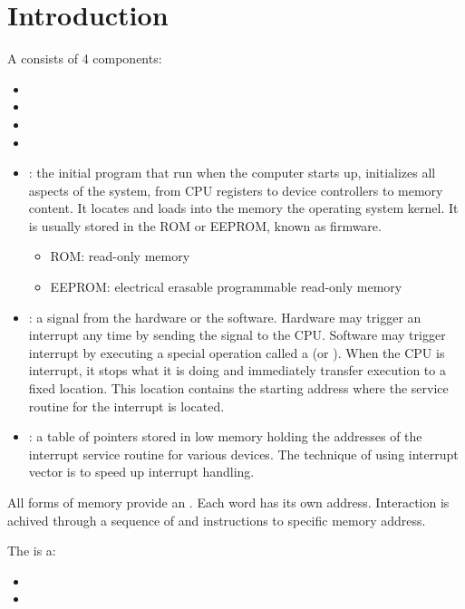 \chapter{Introduction}


    \par A  consists of 4 components:
    \begin{itemize}
      \item {}
      \item {}
      \item {}
      \item {}
    \end{itemize}


    \begin{itemize}
      \item {}: the initial program that run when the computer
        starts up, initializes all aspects of the system, from CPU registers to
          device controllers to memory content. It locates and loads into the
          memory the operating system kernel. It is usually stored in the ROM
          or EEPROM, known as firmware.
        \begin{itemize}
          \item ROM: read-only memory
          \item EEPROM: electrical erasable programmable read-only memory
        \end{itemize}
      \item {}: a signal from the hardware or the software.
        Hardware may trigger an interrupt any time by sending the signal to the
        CPU. Software may trigger interrupt by executing a special operation
        called a  (or ). When the CPU is
        interrupt, it stops what it is doing and immediately transfer execution
        to a fixed location. This location contains the starting address where
        the service routine for the interrupt is located.
      \item {}: a table of pointers stored in low memory
        holding the addresses of the interrupt service routine for various
        devices. The technique of using interrupt vector is to speed up
        interrupt handling.
    \end{itemize}

    \par All forms of memory provide an . Each word has its
      own address. Interaction is achived through a sequence of  and
       instructions to specific memory address.

  \par The  is a:
  \begin{itemize}
    \item {}
    \item {}
  \end{itemize}
